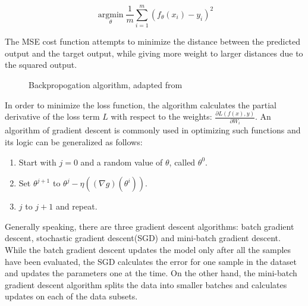\documentclass[english, 12pt, a4paper, elec, utf8, a-1b, online]{aaltothesis}
\begin{document}
\begin{equation}
\underset{\theta}{\operatorname{argmin}} \frac{1}{m} \sum_{i=1}^{m}\left(f_{\theta}\left(x_{i}\right)-y_{i}\right)^{2}
\end{equation}

The MSE cost function attempts to minimize the distance between the predicted output and the target output, while giving more weight to larger distances due to the squared output. \cite{Albarghouthi2021} 


\begin{figure}[htb]
    \centering
    \qquad
    \caption{Backpropogation algorithm, adapted from }\cite{Alber2018}
    \label{fig:backprop}%
\end{figure}
\FloatBarrier

In order to minimize the loss function, the algorithm calculates the partial derivative of the loss term $L$ with respect to the weights: $\frac{\partial L(f(x), y)}{\partial W_{i}}$. An algorithm of gradient descent is commonly used in optimizing such functions and its logic can be generalized as follows: 

\begin{enumerate}
  \item Start with $j=0$ and a random value of $\theta$, called $\theta^{0}$.
  \item Set $\theta^{j+1}$ to $\theta^{j}-\eta\left((\nabla g)\left(\theta^{i}\right)\right)$.
  \item $j$ to $j+1$ and repeat.\cite{Albarghouthi2021} 
\end{enumerate} 

Generally speaking, there are three gradient descent algorithms: batch gradient descent, stochastic gradient descent(SGD) and mini-batch gradient descent. While the batch gradient descent updates the model only after all the samples have been evaluated, the SGD calculates the error for one sample in the dataset and updates the parameters one at the time. On the other hand, the mini-batch gradient descent algorithm splits the data into smaller batches and calculates updates on each of the data subsets. 
\end{document}
